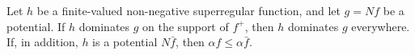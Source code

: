 Let $h$ be a finite-valued non-negative superregular function, and let $g = Nf$ be a potential. If $h$ dominates $g$ on the support of $f^+$, then $h$ dominates $g$ everywhere. If, in addition, $h$ is a potential $N\bar{f}$, then $\alpha f \leq \alpha \bar{f}$.

